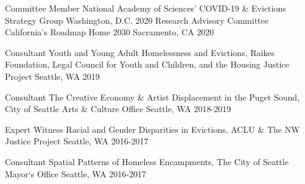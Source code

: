 \begin{cvhonors}

  \cvhonor
    {Committee Member} %
    {National Academy of Sciences' COVID-19 \& Evictions Strategy Group} %
    {Washington, D.C.} %
    {2020} %
  \cvhonor
    {Research Advisory Committee} %
    {California's Roadmap Home 2030} %
    {Sacramento, CA} %
    {2020} %
    
  \cvhonor
    {Consultant} %
    {Youth and Young Adult Homelessness and Evictions, Raikes Foundation, Legal Council for Youth and Children, and the Housing Justice Project} %
    {Seattle, WA} %
    {2019} %

  \cvhonor
    {Consultant} %
    {The Creative Economy \& Artist Displacement in the Puget Sound, City of Seattle Arts \& Culture Office} %
    {Seattle, WA} %
    {2018-2019} %

  \cvhonor
    {Expert Witness} %
    {Racial and Gender Disparities in Evictions, ACLU \& The NW Justice Project} %
    {Seattle, WA} %
    {2016-2017} %

  \cvhonor
    {Consultant} %
    {Spatial Patterns of Homeless Encampments, The City of Seattle Mayor‘s Office} %
    {Seattle, WA} %
    {2016-2017} %

\end{cvhonors}